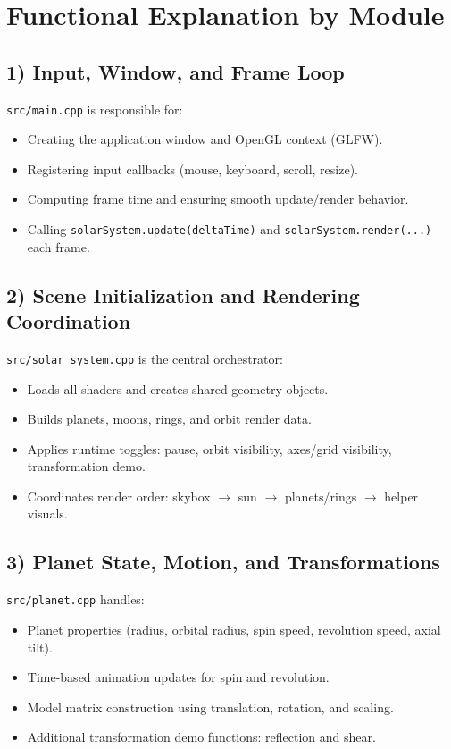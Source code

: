 \documentclass[11pt,a4paper]{article}
\begin{document}
\section{Functional Explanation by Module}

\subsection{1) Input, Window, and Frame Loop}
\texttt{src/main.cpp} is responsible for:
\begin{itemize}[leftmargin=*]
    \item Creating the application window and OpenGL context (GLFW).
    \item Registering input callbacks (mouse, keyboard, scroll, resize).
    \item Computing frame time and ensuring smooth update/render behavior.
    \item Calling \texttt{solarSystem.update(deltaTime)} and \texttt{solarSystem.render(...)} each frame.
\end{itemize}

\subsection{2) Scene Initialization and Rendering Coordination}
\texttt{src/solar\_system.cpp} is the central orchestrator:
\begin{itemize}[leftmargin=*]
    \item Loads all shaders and creates shared geometry objects.
    \item Builds planets, moons, rings, and orbit render data.
    \item Applies runtime toggles: pause, orbit visibility, axes/grid visibility, transformation demo.
    \item Coordinates render order: skybox $\rightarrow$ sun $\rightarrow$ planets/rings $\rightarrow$ helper visuals.
\end{itemize}

\subsection{3) Planet State, Motion, and Transformations}
\texttt{src/planet.cpp} handles:
\begin{itemize}[leftmargin=*]
    \item Planet properties (radius, orbital radius, spin speed, revolution speed, axial tilt).
    \item Time-based animation updates for spin and revolution.
    \item Model matrix construction using translation, rotation, and scaling.
    \item Additional transformation demo functions: reflection and shear.
\end{itemize}
\end{document}
